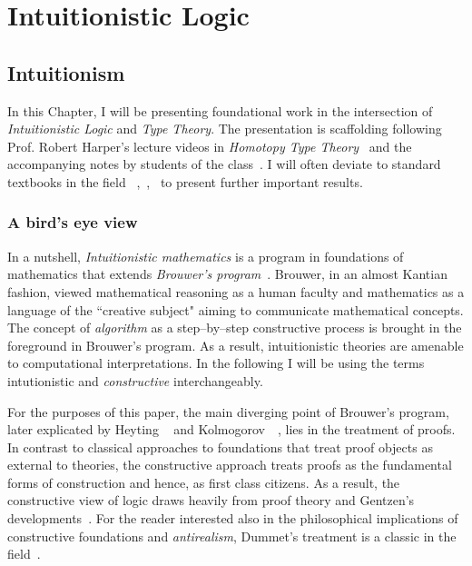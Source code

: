 \chapter{Intuitionistic Logic}\label{intui}
\section{Intuitionism}\label{sec:intrui}
In this Chapter, I will be presenting foundational work in the intersection of \emph{Intuitionistic Logic} and \emph{Type Theory}. 
The presentation is scaffolding following Prof. Robert Harper's lecture videos in \emph{Homotopy Type Theory}~\cite{HarperHOTT} and the accompanying notes by students of the class~\cite{HOTTNotes1}. I will often deviate to standard textbooks in the field ~\cite{Barendregt1984-BARTLC},~\cite{citeulike:993095},~\cite{Pierce:2002:TPL:509043} to present further important results. 
\subsection{A bird's eye view}  
In a nutshell, \emph{Intuitionistic mathematics}  is a program in foundations 
of mathematics  that extends \emph{Brouwer's program}~\cite{brouwer1975collected}.
Brouwer, in an almost Kantian fashion, viewed mathematical reasoning as a human faculty 
and mathematics as a language of the ``creative subject"
aiming to communicate mathematical concepts. 
The concept of \emph{algorithm} as a step--by--step constructive process is brought in the 
foreground in Brouwer's program. As a result, intuitionistic theories are amenable to 
computational interpretations. In the following I will be using the terms intutionistic 
and \emph{constructive} interchangeably.  

For the purposes of this paper, the main diverging point of Brouwer's program, 
later explicated by Heyting ~\cite{heyting1966intuitionism} and Kolmogorov~\cite{kolmogorov1925principe}~\cite{artemov2004kolmogorov}, lies in the treatment of proofs. In contrast to classical approaches to foundations 
that treat proof objects as external to theories, the constructive approach treats proofs 
as the fundamental forms of construction and hence, as first class citizens. 
As a result, the constructive view of logic draws heavily from proof theory
and Gentzen's developments~\cite{gentzen1970collected}. 
For the reader interested also in the philosophical implications  
of constructive foundations and \emph{antirealism}, 
Dummet's treatment is a classic in the field~\cite{dummett2000elements}.    
 


